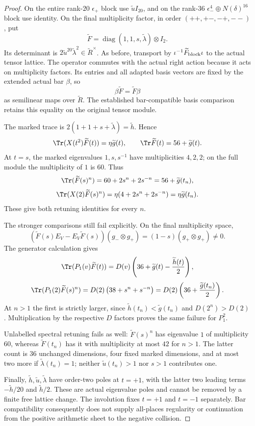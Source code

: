 \documentclass[11pt,a4paper]{article}
\theoremstyle{named}\newtheorem{finding}{Finding}[section]
\theoremstyle{definition}\newtheorem{definition}[finding]{Definition}
\theoremstyle{remark}\newtheorem{remark}[finding]{Remark}
\begin{document}
\begin{proof}
On the entire rank-$20$ $\epsilon_+$ block use
$\widetilde u I_{20}$, and on the rank-$36$
$\epsilon_-^4\oplus N(\delta)^{16}$ block use identity.
On the final multiplicity factor, in order
$(++,+-,-+,--)$, put
\[
 \widetilde F
   =\operatorname{diag}(1,1,s,\widetilde\lambda)\otimes I_2.
\]
Its determinant is
$2\widetilde u^{20}\widetilde\lambda^2\in\widetilde R^\times$.
As before, transport by
$\iota^{-1}\widetilde F_{\rm block}\iota$ to the
actual tensor lattice.
The operator commutes with the actual right action
because it acts on multiplicity factors.
Its entries and all adapted basis vectors are fixed
by the extended actual bar $\beta$, so
\[
 \beta\widetilde F=\widetilde F\beta
\]
as semilinear maps over $\widetilde R$.
The established bar-compatible basis comparison
retains this equality on the original tensor module.

The marked trace is
$2(1+1+s+\widetilde\lambda)=\widetilde h$.
Hence
\begin{equation}\label{eq:barfractionaltraces}
 \Tr(X(t^2)\widetilde F(t))=\eta\widetilde g(t),\qquad
 \Tr\widetilde F(t)=56+\widetilde g(t).
\end{equation}
At $t=s$, the marked eigenvalues $1,s,s^{-1}$
have multiplicities $4,2,2$; on the full module
the multiplicity of $1$ is $60$.
Thus
\[
 \Tr(\widetilde F(s)^n)
       =60+2s^n+2s^{-n}=56+\widetilde g(t_n),
\]
\[
 \Tr(X(2)\widetilde F(s)^n)
       =\eta(4+2s^n+2s^{-n})=\eta\widetilde g(t_n).
\]
These give both retuning identities for every $n$.

The stronger comparisons still fail explicitly.
On the final multiplicity space,
\[
 (\widetilde F(s)E_V-E_V\widetilde F(s))
       (g_-\otimes g_+)
  =(1-s)(g_+\otimes g_+)\ne0.
\]
The generator calculation gives
\[
 \Tr(P_1(v)\widetilde F(t))
    =D(v)\left(36+\widetilde g(t)
                         -\frac{\widetilde h(t)}2\right),
\]
\[
 \Tr(P_1(2)\widetilde F(s)^n)
    =D(2)\left(38+s^n+s^{-n}\right)
    =D(2)\left(36+\frac{\widetilde g(t_n)}2\right).
\]
At $n>1$ the first is strictly larger, since
$\widetilde h(t_n)<\widetilde g(t_n)$ and $D(2^n)>D(2)$.
Multiplication by the respective $D$ factors proves
the same failure for $P_1^2$.

Unlabelled spectral retuning fails as well:
$\widetilde F(s)^n$ has eigenvalue $1$ of multiplicity
$60$, whereas $\widetilde F(t_n)$ has it with
multiplicity at most $42$ for $n>1$.
The latter count is $36$ unchanged dimensions,
four fixed marked dimensions, and at most two more
if $\widetilde\lambda(t_n)=1$; neither
$\widetilde u(t_n)>1$ nor $s>1$ contributes one.

Finally, $\widetilde h,\widetilde u,
\widetilde\lambda$ have order-two poles at $t=+1$,
with the latter two leading terms
$-\widetilde h/20$ and $\widetilde h/2$.
These are actual eigenvalue poles and cannot be
removed by a finite free lattice change.
The involution fixes $t=+1$ and $t=-1$ separately.
Bar compatibility consequently does not supply
all-places regularity or continuation from the
positive arithmetic sheet to the negative collision.
\end{proof}
\end{document}

